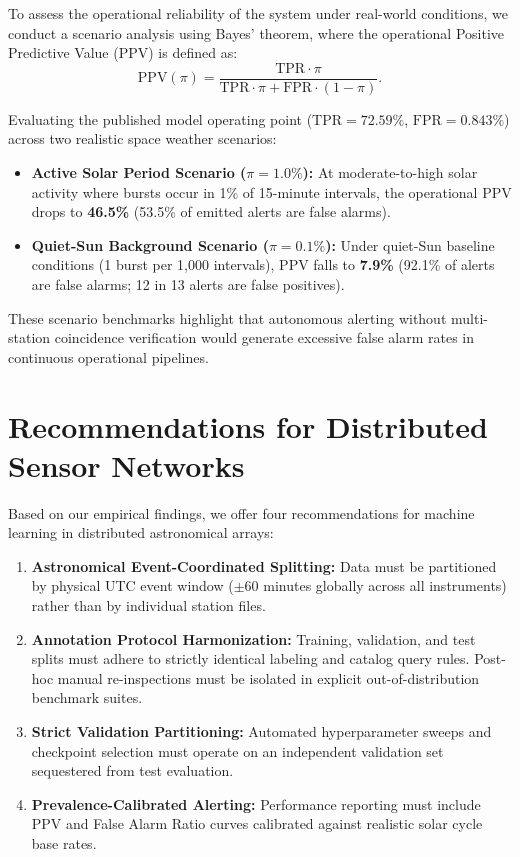 \documentclass[11pt,a4paper]{article}
\begin{document}
To assess the operational reliability of the system under real-world conditions, we conduct a scenario analysis using Bayes' theorem, where the operational Positive Predictive Value (PPV) is defined as:
\begin{equation}
\text{PPV}(\pi) = \frac{\text{TPR} \cdot \pi}{\text{TPR} \cdot \pi + \text{FPR} \cdot (1 - \pi)}.
\end{equation}

Evaluating the published model operating point ($\text{TPR} = 72.59\%$, $\text{FPR} = 0.843\%$) across two realistic space weather scenarios:
\begin{itemize}
    \item \textbf{Active Solar Period Scenario ($\pi = 1.0\%$):} At moderate-to-high solar activity where bursts occur in 1\% of 15-minute intervals, the operational PPV drops to \textbf{46.5\%} (53.5\% of emitted alerts are false alarms).
    \item \textbf{Quiet-Sun Background Scenario ($\pi = 0.1\%$):} Under quiet-Sun baseline conditions (1 burst per 1,000 intervals), PPV falls to \textbf{7.9\%} (92.1\% of alerts are false alarms; 12 in 13 alerts are false positives).
\end{itemize}
These scenario benchmarks highlight that autonomous alerting without multi-station coincidence verification would generate excessive false alarm rates in continuous operational pipelines.

\section{Recommendations for Distributed Sensor Networks}

Based on our empirical findings, we offer four recommendations for machine learning in distributed astronomical arrays:
\begin{enumerate}
    \item \textbf{Astronomical Event-Coordinated Splitting:} Data must be partitioned by physical UTC event window ($\pm 60$ minutes globally across all instruments) rather than by individual station files.
    \item \textbf{Annotation Protocol Harmonization:} Training, validation, and test splits must adhere to strictly identical labeling and catalog query rules. Post-hoc manual re-inspections must be isolated in explicit out-of-distribution benchmark suites.
    \item \textbf{Strict Validation Partitioning:} Automated hyperparameter sweeps and checkpoint selection must operate on an independent validation set sequestered from test evaluation.
    \item \textbf{Prevalence-Calibrated Alerting:} Performance reporting must include PPV and False Alarm Ratio curves calibrated against realistic solar cycle base rates.
\end{enumerate}
\end{document}
